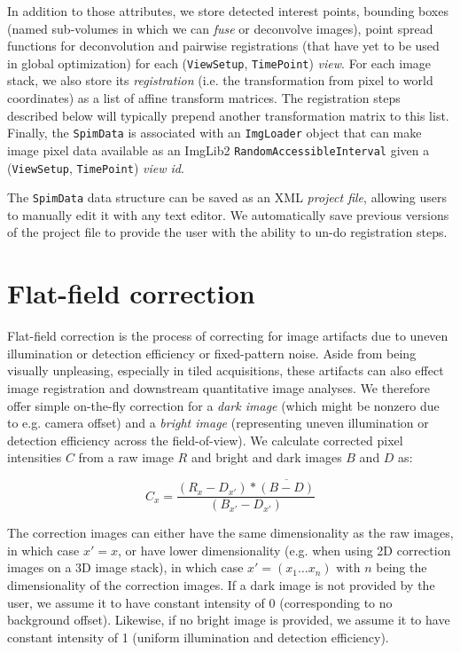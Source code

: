 In addition to those attributes, we store detected interest points, bounding boxes (named sub-volumes in which we can \emph{fuse} or deconvolve images), point spread functions for deconvolution and pairwise registrations (that have yet to be used in global optimization) for each (\texttt{ViewSetup}, \texttt{TimePoint}) \emph{view}. For each image stack, we also store its \emph{registration} (i.e. the transformation from pixel to world coordinates) as a list of affine transform matrices. The registration steps described below will typically prepend another transformation matrix to this list. Finally, the \texttt{SpimData} is associated with an \texttt{ImgLoader} object that can make image pixel data available as an ImgLib2 \cite{imglib2} \texttt{RandomAccessibleInterval} given a  (\texttt{ViewSetup}, \texttt{TimePoint}) \emph{view id}.

The \texttt{SpimData} data structure can be saved as an XML \emph{project file}, allowing users to manually edit it with any text editor. We automatically save previous versions of the project file to provide the user with the ability to un-do registration steps.

\section{Flat-field correction}
\label{sec:flatfield}

Flat-field correction is the process of correcting for image artifacts due to uneven illumination or detection efficiency or fixed-pattern noise. Aside from being visually unpleasing, especially in tiled acquisitions, these artifacts can also effect image registration and downstream quantitative image analyses. We therefore offer simple on-the-fly correction for a \emph{dark image} (which might be nonzero due to e.g. camera offset) and a \emph{bright image} (representing uneven illumination or detection efficiency across the field-of-view). We calculate corrected pixel intensities $C$ from a raw image $R$ and bright and dark images $B$ and $D$ as:

\begin{equation}
\label{eq:flatfield-eq1}
C_{x} = \frac{(R_{x} - D_{x'}) * \overline{(B-D)} }{(B_{x'}- D_{x'})}
\end{equation}

The correction images can either have the same dimensionality as the raw images, in which case $x' = x$, or have lower dimensionality (e.g. when using 2D correction images on a 3D image stack), in which case $x' = (x_1 \hdots x_n)$ with $n$ being the dimensionality of the correction images. If a dark image is not provided by the user, we assume it to have constant intensity of 0 (corresponding to no background offset). Likewise, if no bright image is provided, we assume it to have constant intensity of 1 (uniform illumination and detection efficiency). 

